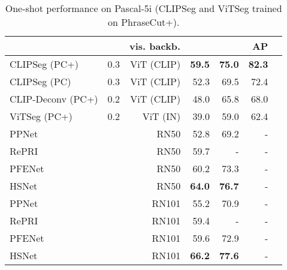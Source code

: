 \documentclass[10pt,twocolumn,letterpaper]{article}
\begin{document}
\begin{table}[t]
    \centering
    \footnotesize
    \begin{tabular}{llrrrrr}
         \toprule
        &  & vis. backb. &  &  &  AP \\
        \midrule
CLIPSeg (PC+) & 0.3 & ViT (CLIP) & \textbf{59.5} & \textbf{75.0} & \textbf{82.3} \\
CLIPSeg (PC)  & 0.3 & ViT (CLIP) & 52.3 & 69.5 & 72.4 \\
CLIP-Deconv (PC+) & 0.2 & ViT (CLIP) & 48.0 & 65.8 & 68.0 \\
ViTSeg (PC+) & 0.2 & ViT (IN) & 39.0 & 59.0 & 62.4 \\
        \midrule
        PPNet  \cite{liu20} & & RN50 & 52.8  & 69.2  & - \\
        RePRI \cite{boudiaf20} & & RN50 & 59.7 & - & -  \\
        PFENet \cite{tian20a} & & RN50 & 60.2  & 73.3 & -  \\
        HSNet \cite{min21hsnet} & & RN50 & \textbf{64.0} & \textbf{76.7} & -\\
        \midrule
        PPNet  \cite{liu20} & & RN101 & 55.2  & 70.9 & -  \\
        RePRI \cite{boudiaf20} & & RN101  & 59.4  & - & - \\
        PFENet \cite{tian20a} & & RN101 & 59.6 & 72.9 & - \\
        HSNet \cite{min21hsnet} & & RN101 & \textbf{66.2} & \textbf{77.6} & - \\
        \bottomrule
         \end{tabular} \caption{One-shot performance on Pascal-5i (CLIPSeg and ViTSeg trained on PhraseCut+).}
    \label{tab:pas5i_oneshot}
\end{table}
\end{document}
